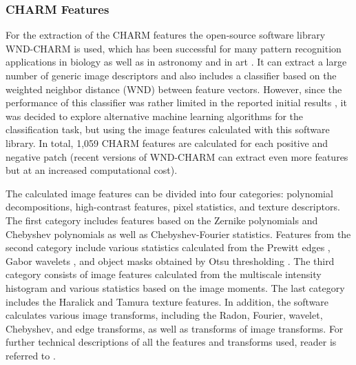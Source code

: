 \subsubsection{CHARM Features}
\label{subsubsec:wnd-chrm}
For the extraction of the CHARM features the open-source software library WND-CHARM \cite{shamir2008wndchrm, orlov2008wnd} is used, which has been successful for many pattern recognition applications in biology \cite{shamir2010pattern, uhlmann2016cp} as well as in astronomy \cite{shamir2012automatic, kuminski2014combining} and in art \cite{shamir2012computer}. It can extract a large number of generic image descriptors and also includes a classifier based on the weighted neighbor distance (WND) between feature vectors. However, since the performance of this classifier was rather limited in the reported initial results \cite{mata2016automatic}, it was decided to explore alternative machine learning algorithms for the classification task, but using the image features calculated with this software library. In total, 1,059 CHARM features are calculated for each positive and negative patch (recent versions of WND-CHARM can extract even more features but at an increased computational cost).

The calculated image features can be divided into four categories: polynomial decompositions, high-contrast features, pixel statistics, and texture descriptors. The first category includes features based on the Zernike polynomials and Chebyshev polynomials \cite{gradshteyn2014table} as well as Chebyshev-Fourier statistics. Features from the second category include various statistics calculated from the Prewitt edges \cite{prewitt1970object}, Gabor wavelets \cite{gabor1946theory}, and object masks obtained by Otsu thresholding \cite{otsu1979threshold}. The third category consists of image features calculated from the multiscale intensity histogram \cite{hadjidemetriou2001spatial} and various statistics based on the image moments. The last category includes the Haralick \cite{haralick1973textural} and Tamura \cite{tamura1978textural} texture features. In addition, the software calculates various image transforms, including the Radon, Fourier, wavelet, Chebyshev, and edge transforms, as well as transforms of image transforms. For further technical descriptions of all the features and transforms used, reader is referred to \cite{orlov2008wnd}.

